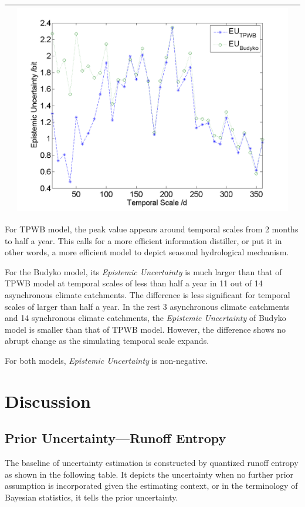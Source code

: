 \documentclass[draft,wrr]{AGUTeX}
\begin{document}
\begin{article}
\begin{table}[H]
{\begin{tabular}{ccc}
&\begin{minipage}{.6\textwidth}\includegraphics[width=\linewidth]{resultgraph/11532500EU.png}\end{minipage}
\\
\hline
\end{tabular}
}
\end{table} 
For TPWB model, the peak value appears around temporal scales from 2 months to half a year. This calls for a more efficient information distiller, or put it in other words, a more efficient model to depict seasonal hydrological mechanism.  

For the Budyko model, its \emph{Epistemic Uncertainty} is much larger than that of TPWB model at temporal scales of less than half a year in 11 out of 14 asynchronous climate catchments. The difference is less significant for temporal scales of larger than half a year. In the rest 3 asynchronous climate catchments and 14 synchronous climate catchments, the \emph{Epistemic Uncertainty} of Budyko model is smaller than that of TPWB model. However, the difference shows no abrupt change as the simulating temporal scale expands. 




For both models,  \emph{Epistemic Uncertainty} is non-negative.

\section{Discussion}
\subsection{Prior Uncertainty---Runoff Entropy}
The baseline of uncertainty estimation is constructed by  quantized runoff entropy as shown in the following table. It depicts the uncertainty when no further prior assumption is incorporated given the estimating context, or in the terminology of Bayesian statistics, it tells the prior uncertainty.


\end{article}
\end{document}
